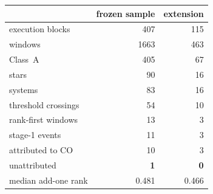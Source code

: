 \begin{tabular}{@{}lrr@{}}
\toprule
 & frozen sample & extension \\
\midrule
execution blocks & 407 & 115 \\
windows & 1663 & 463 \\
\quad Class~A & 405 & 67 \\
stars & 90 & 16 \\
systems & 83 & 16 \\
\midrule
threshold crossings & 54 & 10 \\
rank-first windows & 13 & 3 \\
stage-1 events & 11 & 3 \\
\quad attributed to CO & 10 & 3 \\
\quad unattributed & \textbf{1} & \textbf{0} \\
\midrule
median add-one rank & 0.481 & 0.466 \\
\bottomrule
\end{tabular}
